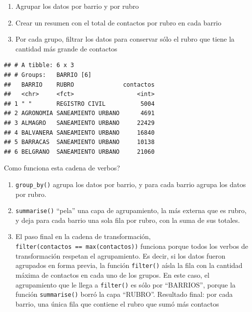 \documentclass[]{book}
\newenvironment{Shaded}{\begin{snugshade}}{\end{snugshade}}
\newcommand{\KeywordTok}[1]{\textcolor[rgb]{0.13,0.29,0.53}{\textbf{#1}}}
\newcommand{\DataTypeTok}[1]{\textcolor[rgb]{0.13,0.29,0.53}{#1}}
\newcommand{\StringTok}[1]{\textcolor[rgb]{0.31,0.60,0.02}{#1}}
\newcommand{\OperatorTok}[1]{\textcolor[rgb]{0.81,0.36,0.00}{\textbf{#1}}}
\newcommand{\NormalTok}[1]{#1}
\providecommand{\tightlist}{%
  \setlength{\itemsep}{0pt}\setlength{\parskip}{0pt}}
\begin{document}
\begin{enumerate}
\def\labelenumi{\arabic{enumi}.}
\tightlist
\item
  Agrupar los datos por barrio y por rubro
\item
  Crear un resumen con el total de contactos por rubro en cada barrio
\item
  Por cada grupo, filtrar los datos para conservar sólo el rubro que
  tiene la cantidad más grande de contactos
\end{enumerate}

\begin{Shaded}
\end{Shaded}

\begin{verbatim}
## # A tibble: 6 x 3
## # Groups:   BARRIO [6]
##   BARRIO    RUBRO              contactos
##   <chr>     <fct>                  <int>
## 1 " "       REGISTRO CIVIL          5004
## 2 AGRONOMIA SANEAMIENTO URBANO      4691
## 3 ALMAGRO   SANEAMIENTO URBANO     22429
## 4 BALVANERA SANEAMIENTO URBANO     16840
## 5 BARRACAS  SANEAMIENTO URBANO     10138
## 6 BELGRANO  SANEAMIENTO URBANO     21060
\end{verbatim}

Como funciona esta cadena de verbos?

\begin{enumerate}
\def\labelenumi{\arabic{enumi}.}
\item
  \texttt{group\_by()} agrupa los datos por barrio, y para cada barrio
  agrupa los datos por rubro.
\item
  \texttt{summarise()} ``pela'' una capa de agrupamiento, la más externa
  que es rubro, y deja para cada barrio una sola fila por rubro, con la
  suma de sus totales.
\item
  El paso final en la cadena de transformación,
  \texttt{filter(contactos\ ==\ max(contactos))} funciona porque todos
  los verbos de transformación respetan el agrupamiento. Es decir, si
  los datos fueron agrupados en forma previa, la función
  \texttt{filter()} aísla la fila con la cantidad máxima de contactos en
  cada uno de los grupos. En este caso, el agrupamiento que le llega a
  \texttt{filter()} es sólo por ``BARRIOS'', porque la función
  \texttt{summarise()} borró la capa ``RUBRO''. Resultado final: por
  cada barrio, una única fila que contiene el rubro que sumó más
  contactos
\end{enumerate}
\end{document}
